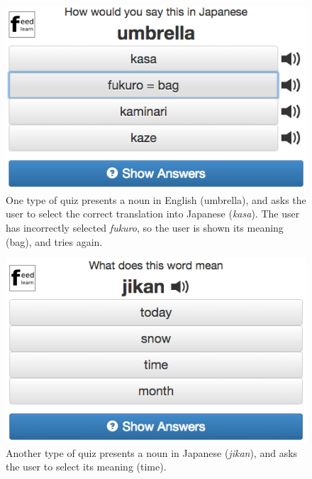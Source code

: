 \documentclass{sigchi}
\begin{document}
\begin{figure}
\centering
\includegraphics[width=1.0\columnwidth]{quiz2}
\caption{One type of quiz presents a noun in English (umbrella), and asks the user to select the correct translation into Japanese (\textit{kasa}). The user has incorrectly selected \textit{fukuro}, so the user is shown its meaning (bag), and tries again.}
\label{fig:quiz2}
\end{figure}

\begin{figure}
\centering
\includegraphics[width=1.0\columnwidth]{quiz1}
\caption{Another type of quiz presents a noun in Japanese (\textit{jikan}), and asks the user to select its meaning (time).}
\label{fig:quiz1}
\end{figure}
\end{document}
